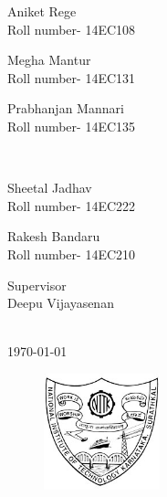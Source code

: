 \documentclass[12pt]{article}
\begin{document}
\begin{titlepage}
\begin{minipage}{0.5\textwidth}
\begin{flushleft} \small 
Aniket Rege\\ %
Roll number- \textsc{14EC108}
\end{flushleft}
\begin{flushleft} \small
Megha Mantur\\ %
Roll number- \textsc{14EC131}
\end{flushleft}
\begin{flushleft} \small
Prabhanjan Mannari\\ %
Roll number- \textsc{14EC135}
\end{flushleft}
\end{minipage}
~
\begin{minipage}{0.4\textwidth}
\begin{flushright} \small
Sheetal Jadhav\\ %
Roll number- \textsc{14EC222}
\end{flushright}
\begin{flushright} \small
Rakesh Bandaru\\ %
Roll number- \textsc{14EC210}
\end{flushright}
\begin{flushright} 
Supervisor\\ %
Deepu Vijayasenan
\end{flushright}
\end{minipage}\\[2cm]



{\today}\\[0.3cm] %

 
\begin{figure}[ht]
\centering
	\includegraphics[width=0.3\textwidth]{NITK_Emblem.png}
\end{figure}


\end{titlepage}
\end{document}
